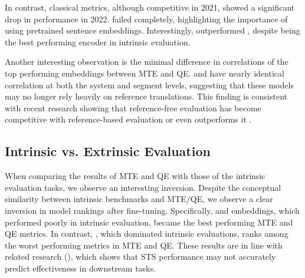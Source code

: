 In contrast, classical metrics, although competitive in 2021, showed a significant drop in performance in 2022. \cometm{\randombert} failed completely, highlighting the importance of using pretrained sentence embeddings. Interestingly, \cometq{\randombert} outperformed \cometq{\simcse}, despite \simcse being the best performing encoder in intrinsic evaluation.

Another interesting observation is the minimal difference in correlations of the top performing embeddings between MTE and QE. \cometm{\fernet} and \cometq{\fernet} have  nearly identical correlation at both the system and segment levels, suggesting that these models may no longer rely heavily on reference translations. This finding is consistent with recent research showing that reference-free evaluation has become competitive with reference-based evaluation \citep{rei-etal-2021-references} or even outperforms it \citep{Moosa2024MTRankerRM}.


\subsection{Intrinsic vs. Extrinsic Evaluation}

When comparing the results of MTE and QE with those of the intrinsic evaluation tasks, we observe an interesting inversion. Despite the conceptual similarity between intrinsic benchmarks and MTE/QE, we observe a clear inversion in model rankings after fine-tuning. Specifically, \xlmr and \fernet embeddings, which performed poorly in intrinsic evaluation, became the best performing MTE and QE metrics. In contrast, \simcse, which dominated intrinsic evaluations, ranks among the worst performing metrics in MTE and QE. These results are in line with related research (), which shows that STS performance may not accurately predict effectiveness in downstream tasks.


